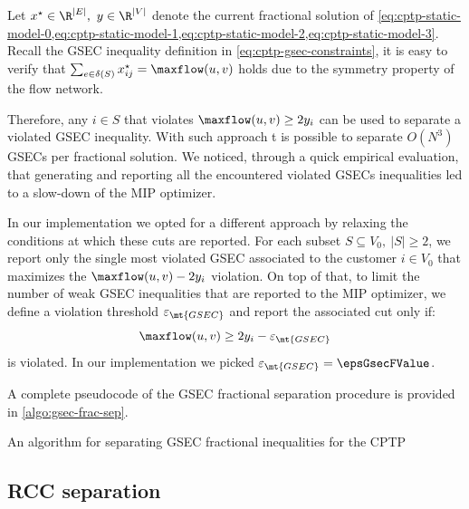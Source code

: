 Let $x^\star \in \R^{|E|},\ y \in \R^{|V|}$ denote the
current fractional solution of
\cref{eq:cptp-static-model-0,eq:cptp-static-model-1,eq:cptp-static-model-2,eq:cptp-static-model-3}.
Recall the GSEC inequality definition in \cref{eq:cptp-gsec-constraints},
it is easy to verify that $\sum_{e \in \delta(S)} x^\star_{ij} = \maxflow(u, v)$
holds due to the symmetry property of the flow network.

Therefore, any $i \in S$ that violates $\maxflow(u, v) \ge 2 y_i$
can be used to separate a violated GSEC inequality.
With such approach t is possible to separate $O(N^3)$ GSECs per fractional solution.
We noticed, through a quick empirical evaluation, that
generating and reporting all the encountered violated GSECs inequalities
led to a slow-down of the MIP optimizer.

\medskip
In our implementation we opted for a different approach by relaxing the conditions at which these cuts are reported.
For each subset $S \subseteq V_0,\ |S| \ge 2$, we report only the single most violated GSEC
associated to the customer $i \in V_0$ that maximizes the $\maxflow(u, v) - 2 y_i$ violation.
On top of that, to limit the number of weak GSEC inequalities that are reported to the MIP optimizer,
we define a violation threshold $\varepsilon_{\mt{GSEC}}$ and report the associated cut only if:
\begin{equation}
	\maxflow(u, v) \ge 2 y_i - \varepsilon_{\mt{GSEC}}
\end{equation}
is violated.
In our implementation we picked $\varepsilon_{\mt{GSEC}} = \epsGsecFValue$.

A complete pseudocode of the GSEC fractional separation procedure is provided in \cref{algo:gsec-frac-sep}.

\begin{algorithm}
	\caption{An algorithm for separating GSEC fractional inequalities for the CPTP}
	\label{algo:gsec-frac-sep}
	
\end{algorithm}

\subsection{RCC separation}
\label{sec:impl-rcc-separation}


